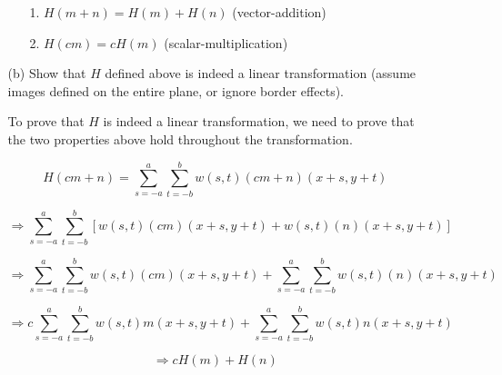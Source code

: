 \documentclass{article}
\begin{document}
\begin{enumerate}
\begin{enumerate}
\begin{enumerate}
\item[1.] $H(m + n) = H(m) + H(n)$ \quad (vector-addition)
\item[2.] $H(cm)=cH(m)$ \quad\quad\kern 0.45in (scalar-multiplication)
\end{enumerate}

\item[(b)]  Show that $H$ defined above is indeed a linear transformation (assume images defined
on the entire plane, or ignore border effects).

To prove that $H$ is indeed a linear transformation, we need to prove that the two properties above hold throughout the transformation.

\begin{equation}
H(cm + n) = \sum_{s=-a}^{a} \sum_{t=-b}^{b} w(s,t)(cm+n)(x+s, y+t)
\end{equation}

\begin{equation}
\Rightarrow \sum_{s=-a}^{a} \sum_{t=-b}^{b} \left[ w(s,t)(cm)(x+s,y+t) + w(s,t)(n)(x+s,y+t) \right]
\end{equation}

\begin{equation}
\Rightarrow \sum_{s=-a}^{a} \sum_{t=-b}^{b} w(s,t)(cm)(x+s,y+t) + \sum_{s=-a}^{a} \sum_{t=-b}^{b} w(s,t)(n)(x+s,y+t)
\end{equation}

\begin{equation}
\Rightarrow c\sum_{s=-a}^{a} \sum_{t=-b}^{b} w(s,t)m(x+s,y+t) + \sum_{s=-a}^{a} \sum_{t=-b}^{b} w(s,t)n(x+s,y+t)
\end{equation}

\begin{equation}
\Rightarrow cH(m) + H(n)
\end{equation}

\end{enumerate}
\end{enumerate}
\end{document}
